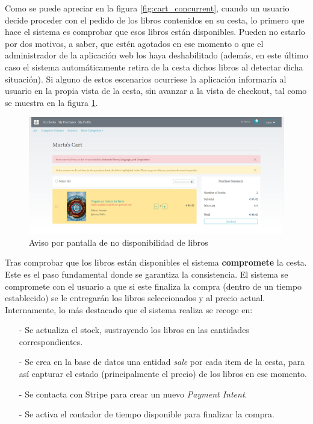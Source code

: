 \documentclass[a4paper]{article}
\begin{document}
    Como se puede apreciar en la figura \ref{fig:cart_concurrent}, cuando un usuario decide proceder con el pedido de los libros contenidos en su cesta, lo primero que hace el sistema es comprobar que esos libros están disponibles. Pueden no estarlo por dos motivos, a saber, que estén agotados en ese momento o que el administrador de la aplicación web los haya deshabilitado (además, en este último caso el sistema automáticamente retira de la cesta dichos libros al detectar dicha situación). Si alguno de estos escenarios ocurriese la aplicación informaría al usuario en la propia vista de la cesta, sin avanzar a la vista de checkout, tal como se muestra en la figura \ref{fig:cart_alert}.
    
    \begin{figure}[hbt!]
    	\centering
    	\includegraphics[width=\textwidth]{cart_alert}
    	\caption{Aviso por pantalla de no disponibilidad de libros}
    	\label{fig:cart_alert}
    \end{figure}
    
    Tras comprobar que los libros están disponibles el sistema \textbf{compromete} la cesta. Este es el paso fundamental donde se garantiza la consistencia. El sistema se compromete con el usuario a que si este finaliza la compra (dentro de un tiempo establecido) se le entregarán los libros seleccionados y al precio actual. Internamente, lo más destacado que el sistema realiza se recoge en:
    
    \begin{itemize}
    	\item[-] Se actualiza el stock, sustrayendo los libros en las cantidades correspondientes.
    	\item[-] Se crea en la base de datos una entidad \emph{sale} por cada item de la cesta, para así capturar el estado (principalmente el precio) de los libros en ese momento.
    	\item[-] Se contacta con Stripe para crear un nuevo \emph{Payment Intent}.
    	\item[-] Se activa el contador de tiempo disponible para finalizar la compra.
    \end{itemize}
    
\end{document}
